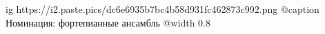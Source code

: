  
 
 
 
 

\ifcmt
  ig https://i2.paste.pics/dc6e6935b7bc4b58d931fc462873c992.png
  @caption Номинация: фортепианные ансамбль 
	@width 0.8
\fi
